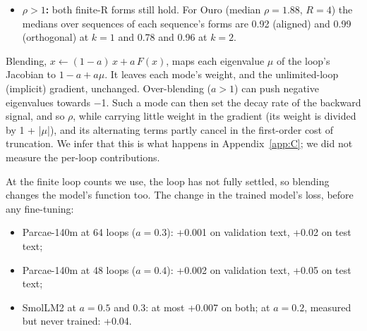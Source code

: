 \documentclass[10pt]{article}
\begin{document}
\begin{itemize}
\begin{itemize}
\item \textbf{A fixed rotation:} if $b_{j+1} = Q b_j$ for an orthogonal Q, the first sum is $Q^{k}$ applied to the second with its last $k$ terms removed. Both sums tend to the same size as $R$ grows, so the lost gradient tends to $\rho^{k}$ in every sequence.
\item \textbf{Stationary statistics:} if the $b_j$ are random and the expected inner product of $b_i$ and $b_j$ depends only on the lag j $-$ i, the expected squared size of $\sum_{i<N} \rho^{i} b_{i+k}$ is $\sum_{i,i'<N} \rho^{i+i'} C(i'-i)$, with C the expected inner product at each lag, which does not depend on $k$. So $\mathbb{E}|D_k|^2 / \mathbb{E}|D_0|^2$ tends to $\rho^{2k}$, with corrections of order $\rho^{R-k}$. This holds for the ratio of expectations, not for each sequence or for the median over sequences that we report.
\end{itemize}
\item \textbf{$\rho > 1$:} both finite-R forms still hold. For Ouro (median $\rho = 1.88$, $R = 4$) the medians over sequences of each sequence's forms are 0.92 (aligned) and 0.99 (orthogonal) at $k = 1$ and 0.78 and 0.96 at $k = 2$.
\end{itemize}

Blending, $x \leftarrow (1-a)\,x + a\,F(x)$, maps each eigenvalue $\mu$ of the loop's Jacobian to $1 - a + a\mu$. It leaves each mode's weight, and the unlimited-loop (implicit) gradient, unchanged. Over-blending ($a > 1$) can push negative eigenvalues towards $-$1. Such a mode can then set the decay rate of the backward signal, and so $\rho$, while carrying little weight in the gradient (its weight is divided by 1 + |$\mu$|), and its alternating terms partly cancel in the first-order cost of truncation. We infer that this is what happens in Appendix~\ref{app:C}; we did not measure the per-loop contributions.

At the finite loop counts we use, the loop has not fully settled, so blending changes the model's function too. The change in the trained model's loss, before any fine-tuning:

\begin{itemize}
\item Parcae-140m at 64 loops ($a = 0.3$): +0.001 on validation text, +0.02 on test text;
\item Parcae-140m at 48 loops ($a = 0.4$): +0.002 on validation text, +0.05 on test text;
\item SmolLM2 at $a = 0.5$ and 0.3: at most +0.007 on both; at $a = 0.2$, measured but never trained: +0.04.
\end{itemize}
\end{document}
